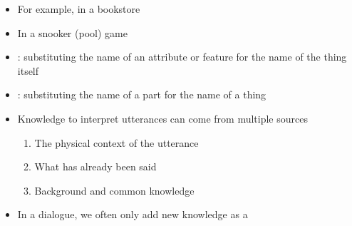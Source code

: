 \documentclass[headrule,footrule]{foils}
\begin{document}
\begin{itemize}\addtolength{\itemsep}{-1ex}
\item For example, in a bookstore
  \begin{exe}
    \ex {}
  \end{exe}
\item In a snooker (pool)  game
  \begin{exe}
    \ex {}
  \end{exe}
\item {}: substituting the name of an attribute or feature for the name of the thing itself
  \begin{exe}
    \ex {}
    \ex {}
  \end{exe}
  \item {}: substituting the name of a part for the name of a thing
  \begin{exe}
    \ex {}
  \end{exe}
\end{itemize}


\begin{itemize}
\item Knowledge to interpret utterances can come from multiple sources
  \begin{enumerate}
  \item The physical context of the utterance
    \\ 
  \item What has already been said
    \\ 
  \item Background and common knowledge
    \\ 
  \end{enumerate}
\item In a dialogue, we often only add new knowledge as a 
  \begin{exe}
    \ex 
    \begin{xlist}
      \ex {}
      \ex {}
  \end{xlist}
\end{exe}
\end{itemize}
\end{document}
